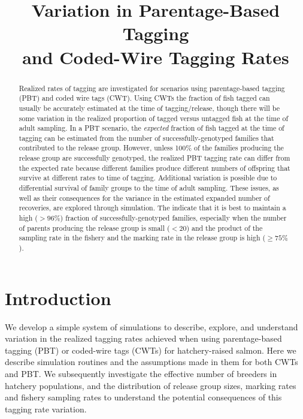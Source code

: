 \documentclass[11pt]{article}
\title{Variation in Parentage-Based Tagging \\
and Coded-Wire  Tagging  Rates}
\begin{document}
\maketitle


\begin{abstract}
Realized rates of tagging are investigated for scenarios using parentage-based tagging (PBT)
and coded wire tags (CWT).  
Using CWTs the fraction of fish tagged can usually be accurately
estimated at the time of tagging/release, though there will be some variation in the realized
proportion of tagged versus untagged fish at the time of adult sampling.  In a PBT
scenario, the {\em expected} fraction of fish tagged at the time of tagging can be
estimated from the number of successfully-genotyped families that
contributed to the release group.  However, unless 100\% of the families producing the release
group are successfully genotyped, the realized PBT tagging rate can differ from the
expected rate because different families produce different numbers of offspring that survive
at different rates to time of tagging.  Additional variation is possible due to differential
survival of family groups to the time of adult sampling.  These issues, as well as their
consequences for the variance in the estimated expanded number of recoveries, are explored
through simulation.  The indicate that it is best to maintain a high ($>96\%$) fraction
of successfully-genotyped families, especially when the number of parents producing the release
group is small ($<20$) and the product of the sampling rate in the fishery
and the marking rate in the release group is high ($\geq 75\%$).

\end{abstract}


\tableofcontents

\section{Introduction}
We develop a simple system of simulations to describe, explore, and understand
variation in the realized tagging rates achieved when using parentage-based tagging (PBT)
or coded-wire tags (CWTs) for hatchery-raised salmon.  Here we describe simulation routines
and the assumptions made in them for both CWTs and PBT.  We subsequently investigate the effective
number of breeders in hatchery populations, and the distribution
of release group sizes, marking rates and fishery sampling rates to understand the potential
consequences of this tagging rate variation.
\end{document}
